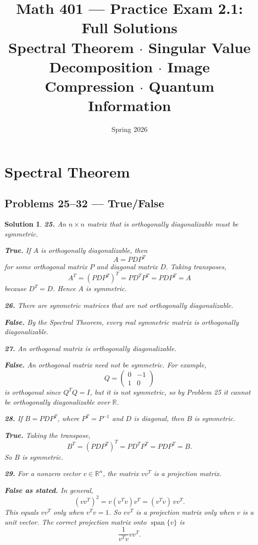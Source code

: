 \documentclass[11pt,a4paper]{article}
\title{\textbf{Math 401 --- Practice Exam 2.1: Full Solutions}\\[0.4em]
\normalsize Spectral Theorem $\cdot$ Singular Value Decomposition $\cdot$ Image Compression $\cdot$ Quantum Information}
\date{Spring 2026}
\author{}
\theoremstyle{sol}
\newtheorem*{solution}{Solution}
\newcommand{\R}{\mathbb{R}}
\newcommand{\Span}{\operatorname{span}}
\begin{document}
\maketitle
\tableofcontents
\clearpage

\section{Spectral Theorem}

\subsection*{Problems 25--32 --- True/False}

\begin{solution}
\textbf{25.} \emph{An $n\times n$ matrix that is orthogonally diagonalizable must be symmetric.}

\textbf{True.} If $A$ is orthogonally diagonalizable, then
\[
A=PDP^T
\]
for some orthogonal matrix $P$ and diagonal matrix $D$. Taking transposes,
\[
A^T=(PDP^T)^T=P D^T P^T=PDP^T=A
\]
because $D^T=D$. Hence $A$ is symmetric.

\medskip
\textbf{26.} \emph{There are symmetric matrices that are not orthogonally diagonalizable.}

\textbf{False.} By the Spectral Theorem, every real symmetric matrix is orthogonally diagonalizable.

\medskip
\textbf{27.} \emph{An orthogonal matrix is orthogonally diagonalizable.}

\textbf{False.} An orthogonal matrix need not be symmetric. For example,
\[
Q=\begin{pmatrix}0&-1\\1&0\end{pmatrix}
\]
is orthogonal since $Q^TQ=I$, but it is not symmetric, so by Problem 25 it cannot be orthogonally diagonalizable over $\R$.

\medskip
\textbf{28.} \emph{If $B=PDP^T$, where $P^T=P^{-1}$ and $D$ is diagonal, then $B$ is symmetric.}

\textbf{True.} Taking the transpose,
\[
B^T=(PDP^T)^T=PD^TP^T=PDP^T=B.
\]
So $B$ is symmetric.

\medskip
\textbf{29.} \emph{For a nonzero vector $v\in\R^n$, the matrix $vv^T$ is a projection matrix.}

\textbf{False as stated.} In general,
\[
(vv^T)^2=v(v^Tv)v^T=(v^Tv)\,vv^T.
\]
This equals $vv^T$ only when $v^Tv=1$. So $vv^T$ is a projection matrix only when $v$ is a \emph{unit} vector. The correct projection matrix onto $\Span\{v\}$ is
\[
\frac{1}{v^Tv}vv^T.
\]


\end{solution}
\end{document}
